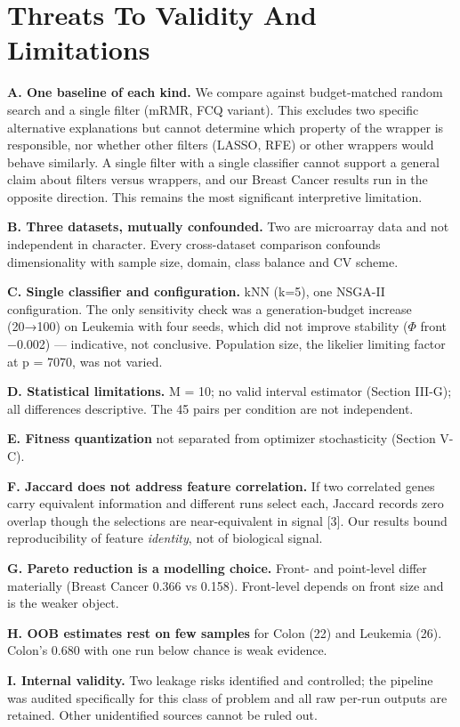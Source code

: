 \documentclass[conference]{IEEEtran}
\begin{document}
\section{Threats To Validity And Limitations}

\textbf{A. One baseline of each kind.} We compare against budget-matched random search and a single filter (mRMR, FCQ variant). This excludes two specific alternative explanations but cannot determine which property of the wrapper is responsible, nor whether other filters (LASSO, RFE) or other wrappers would behave similarly. A single filter with a single classifier cannot support a general claim about filters versus wrappers, and our Breast Cancer results run in the opposite direction. This remains the most significant interpretive limitation.

\textbf{B. Three datasets, mutually confounded.} Two are microarray data and not independent in character. Every cross-dataset comparison confounds dimensionality with sample size, domain, class balance and CV scheme.

\textbf{C. Single classifier and configuration.} kNN (k=5), one NSGA-II configuration. The only sensitivity check was a generation-budget increase (20→100) on Leukemia with four seeds, which did not improve stability ($\Phi$ front $-$0.002) --- indicative, not conclusive. Population size, the likelier limiting factor at p = 7070, was not varied.

\textbf{D. Statistical limitations.} M = 10; no valid interval estimator (Section III-G); all differences descriptive. The 45 pairs per condition are not independent.

\textbf{E. Fitness quantization} not separated from optimizer stochasticity (Section V-C).

\textbf{F. Jaccard does not address feature correlation.} If two correlated genes carry equivalent information and different runs select each, Jaccard records zero overlap though the selections are near-equivalent in signal [3]. Our results bound reproducibility of feature \emph{identity}, not of biological signal.

\textbf{G. Pareto reduction is a modelling choice.} Front- and point-level differ materially (Breast Cancer 0.366 vs 0.158). Front-level depends on front size and is the weaker object.

\textbf{H. OOB estimates rest on few samples} for Colon (22) and Leukemia (26). Colon's 0.680 with one run below chance is weak evidence.

\textbf{I. Internal validity.} Two leakage risks identified and controlled; the pipeline was audited specifically for this class of problem and all raw per-run outputs are retained. Other unidentified sources cannot be ruled out.
\end{document}
